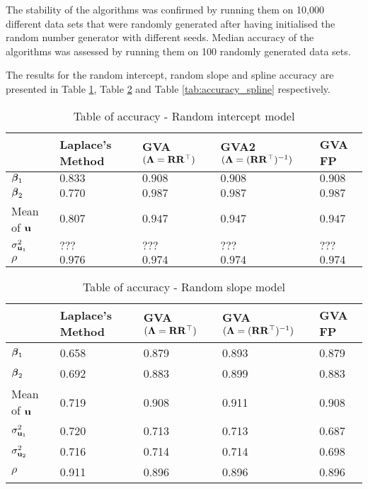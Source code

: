 \documentclass{article}[12pt]
\begin{document}
\noindent The stability of the algorithms was confirmed by running them on 10,000 
different data sets that were randomly generated after having initialised the random 
number generator with different seeds. Median accuracy of the algorithms was assessed
by running them on 100 randomly generated data sets.

The results for the random intercept, random slope and spline accuracy are presented in
Table \ref{tab:accuracy_int}, Table \ref{tab:accuracy_slope} and Table \ref{tab:accuracy_spline}
respectively.


\begin{table}
\caption{Table of accuracy - Random intercept model}
\label{tab:accuracy_int}
\begin{tabular}{l|llll}
\hline
& Laplace's Method & GVA $({\boldsymbol \Lambda} = {\bf R} {\bf R}^\top)$ & GVA2 $({\boldsymbol \Lambda} = ({\bf R} {\bf R}^\top)^{-1})$ & GVA FP\\
\hline
${\boldsymbol \beta}_1$ & $0.833$ & $0.908$ & $0.908$ & $0.908$ \\ 
${\boldsymbol \beta}_2$ & $0.770$ & $0.987$ & $0.987$ & $0.987$ \\ 
Mean of ${\bf u}$ & $0.807$ & $0.947$ & $0.947$ & $0.947$ \\
$\sigma^2_{{\bf u}_1}$ & $???$ & $???$ & $???$ & $???$ \\ 
$\rho$ & $0.976$ & $0.974$ & $0.974$ &  $0.974$ \\ 
\hline
\end{tabular}
\end{table}

\begin{table}
\caption{Table of accuracy - Random slope model}
\label{tab:accuracy_slope}
\begin{tabular}{l|llll}
\hline
& Laplace's Method & GVA $({\boldsymbol \Lambda} = {\bf R} {\bf R}^\top)$ & GVA $({\boldsymbol \Lambda} = ({\bf R} {\bf R}^\top)^{-1})$ & GVA FP\\
\hline
${\boldsymbol \beta}_1$     &0.658&0.879&0.893&0.879\\
${\boldsymbol \beta}_2$     &0.692&0.883&0.899&0.883\\
Mean of ${\bf u}$        &0.719&0.908&0.911&0.908\\
$\sigma^2_{{\bf u}_1}$ &0.720&0.713&0.713&0.687\\
$\sigma^2_{{\bf u}_2}$ &0.716&0.714&0.714&0.698\\
$\rho$ &0.911&0.896&0.896&0.896\\
\hline
\end{tabular}
\end{table}
\end{document}
